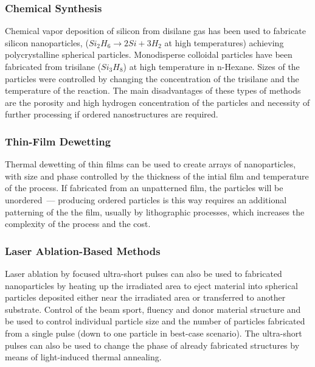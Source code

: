         \subsubsection{Chemical Synthesis}
                Chemical vapor deposition of silicon from disilane gas has been used to fabricate silicon nanoparticles, ($Si_2H_6 \rightarrow 2Si + 3H_2$ at
            high temperatures) achieving polycrystalline spherical particles\cite{shi2012new}. Monodisperse colloidal particles have been fabricated from trisilane ($Si_3H_8$)
            at high temperature in n-Hexane\cite{shi2013monodisperse}. Sizes of the particles were controlled by changing the concentration of the trisilane and the temperature of the
            reaction. The main disadvantages of these types of methods are the porosity and high hydrogen concentration of the particles and necessity of
            further processing if ordered nanostructures are required.

        \subsubsection{Thin-Film Dewetting}
                Thermal dewetting of thin films can be used to create arrays of nanoparticles, with size and phase controlled by the thickness of the intial
            film and temperature of the process\cite{abbarchi2014wafer}. If fabricated from an unpatterned film, the particles will be unordered~--- producing ordered particles is this
            way requires an additional patterning of the the film, usually by lithographic processes, which increases the complexity of the process and the cost.

        \subsubsection{Laser Ablation-Based Methods}
                Laser ablation by focused ultra-short pulses can also be used to fabricated nanoparticles by heating up the irradiated area to eject material into
            spherical particles deposited either near the irradiated area\cite{kuznetsov2012magnetic} or transferred to another substrate\cite{zywietz2014laser}. Control of the beam sport, fluency and donor material
            structure and be used to control individual particle size and the number of particles fabricated from a single pulse (down to one particle in best-case
            scenario). The ultra-short pulses can also be used to change the phase of already fabricated structures by means of light-induced thermal annealing.

